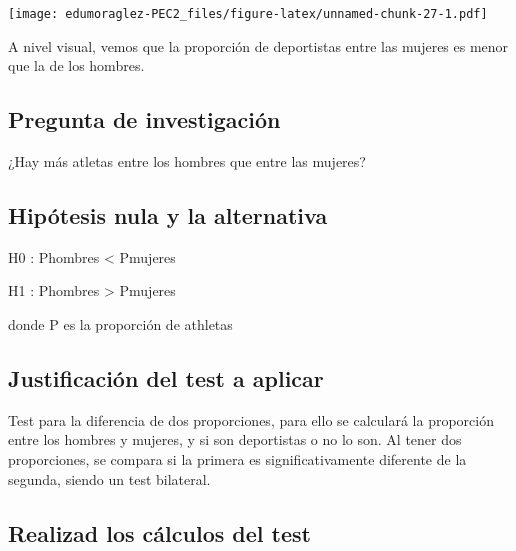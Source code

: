 \documentclass[
]{article}
\begin{document}
\texttt{[image: edumoraglez-PEC2\_files/figure-latex/unnamed-chunk-27-1.pdf]}

A nivel visual, vemos que la proporción de deportistas entre las mujeres
es menor que la de los hombres.

\hypertarget{pregunta-de-investigaciuxf3n-4}{%
\subsection{Pregunta de
investigación}\label{pregunta-de-investigaciuxf3n-4}}

¿Hay más atletas entre los hombres que entre las mujeres?

\hypertarget{hipuxf3tesis-nula-y-la-alternativa-4}{%
\subsection{Hipótesis nula y la
alternativa}\label{hipuxf3tesis-nula-y-la-alternativa-4}}

H0 : Phombres \textless{} Pmujeres

H1 : Phombres \textgreater{} Pmujeres

donde P es la proporción de athletas

\hypertarget{justificaciuxf3n-del-test-a-aplicar-3}{%
\subsection{Justificación del test a
aplicar}\label{justificaciuxf3n-del-test-a-aplicar-3}}

Test para la diferencia de dos proporciones, para ello se calculará la
proporción entre los hombres y mujeres, y si son deportistas o no lo
son. Al tener dos proporciones, se compara si la primera es
significativamente diferente de la segunda, siendo un test bilateral.

\hypertarget{realizad-los-cuxe1lculos-del-test-1}{%
\subsection{Realizad los cálculos del
test}\label{realizad-los-cuxe1lculos-del-test-1}}
\end{document}
